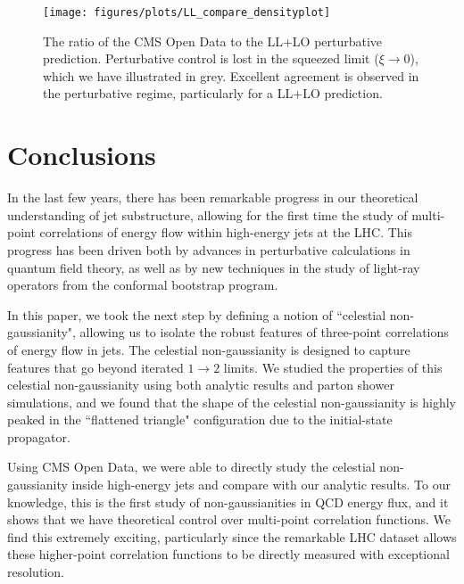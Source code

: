 \documentclass[letterpaper,11pt]{article}
\def\to{\rightarrow}
\begin{document}
\begin{figure}[t]
\begin{center}
\texttt{[image: figures/plots/LL\_compare\_densityplot]}
\caption{
%
The ratio of the CMS Open Data to the LL+LO perturbative prediction. Perturbative control is lost in the squeezed limit ($\xi \to 0$), which we have illustrated in grey. Excellent agreement is observed in the perturbative regime, particularly for a LL+LO prediction.}
\label{fig:OD_shape_error}
\end{center}
\end{figure}




\section{Conclusions}\label{sec:conc}



In the last few years, there has been remarkable progress in our theoretical understanding of jet substructure, allowing for the first time the study of multi-point correlations of energy flow within high-energy jets at the LHC.
%
This progress has been driven both by advances in perturbative calculations in quantum field theory, as well as by new techniques in the study of light-ray operators from the conformal bootstrap program.


In this paper, we took the next step by defining a notion of ``celestial non-gaussianity", allowing us to isolate the robust features of three-point correlations of energy flow in jets.
%
The celestial non-gaussianity is designed to capture features that go beyond iterated $1\to 2$ limits.
%
We studied the properties of this celestial non-gaussianity using both analytic results and parton shower simulations, and we found that the shape of the celestial non-gaussianity is highly peaked in the ``flattened triangle" configuration due to the initial-state propagator.


Using CMS Open Data, we were able to directly study the celestial non-gaussianity inside high-energy jets and compare with our analytic results.
%
To our knowledge, this is the first study of non-gaussianities in QCD energy flux, and it shows that we have theoretical control over multi-point correlation functions.
%
We find this extremely exciting, particularly since the remarkable LHC dataset allows these higher-point correlation functions to be directly measured with exceptional resolution. 
\end{document}
